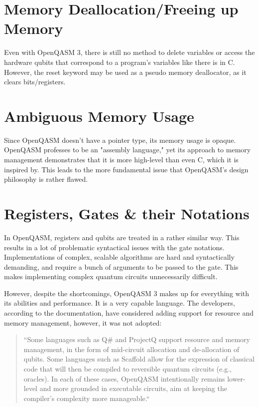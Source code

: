 \documentclass[conference]{IEEEtran}
\begin{document}
\section*{\textbf{Memory Deallocation/Freeing up Memory}}
Even with OpenQASM 3, there is still no method to delete variables or access the hardware qubits that correspond to a program's variables like there is in C. However, the reset keyword may be used as a pseudo memory deallocator, as it clears bits/registers.

\section*{\textbf{Ambiguous Memory Usage}}
Since OpenQASM doesn't have a pointer type, its memory usage is opaque. OpenQASM professes to be an "assembly language," yet its approach to memory management demonstrates that it is more high-level than even C, which it is inspired by. This leads to the more fundamental issue that OpenQASM's design philosophy is rather flawed.

\section*{\textbf{Registers, Gates \& their Notations}}
In OpenQASM, registers and qubits are treated in a rather similar way. This results in a lot of problematic syntactical issues with the gate notations. Implementations of complex, scalable algorithms are hard and syntactically demanding, and require a bunch of arguments to be passed to the gate. This makes implementing complex quantum circuits unnecessarily difficult.

However, despite the shortcomings, OpenQASM 3 makes up for everything with its abilities and performance. It is a very capable language. The developers, according to the documentation, have considered adding support for resource and memory management, however, it was not adopted:

\begin{quote}
    ``Some languages such as Q# and ProjectQ support resource and memory management, in the form of mid-circuit allocation and de-allocation of qubits. Some languages such as Scaffold allow for the expression of classical code that will then be compiled to reversible quantum circuits (e.g., oracles). In each of these cases, OpenQASM intentionally remains lower-level and more grounded in executable circuits, aim at keeping the compiler’s complexity more manageable.\cite{b3}``
\end{quote}
\end{document}
